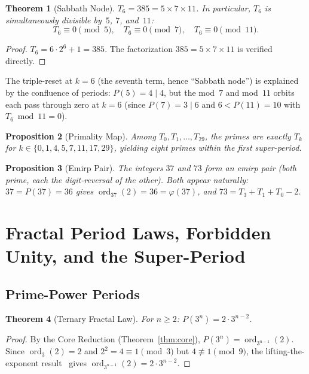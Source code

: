 \documentclass[11pt, a4paper]{article}
\theoremstyle{plain}
\newtheorem{theorem}{Theorem}[section]
\newtheorem{proposition}[theorem]{Proposition}
\theoremstyle{definition}
\theoremstyle{remark}
\newcommand{\ord}{\operatorname{ord}}
\begin{document}
\begin{theorem}[Sabbath Node]\label{thm:sabbath}
$T_6 = 385 = 5 \times 7 \times 11$. In particular, $T_6$ is
simultaneously divisible by~$5$, $7$, and~$11$:
\[
  T_6 \equiv 0 \pmod{5}, \quad
  T_6 \equiv 0 \pmod{7}, \quad
  T_6 \equiv 0 \pmod{11}.
\]
\end{theorem}

\begin{proof}
$T_6 = 6 \cdot 2^6 + 1 = 385$. The factorization $385 = 5 \times 7
\times 11$ is verified directly.
\end{proof}

The triple-reset at $k = 6$ (the seventh term, hence ``Sabbath node'')
is explained by the confluence of periods: $P(5) = 4 \mid 4$, but the
mod~$7$ and mod~$11$ orbits each pass through zero at $k = 6$
(since $P(7) = 3 \mid 6$ and $6 < P(11) = 10$ with
$T_6 \bmod 11 = 0$).

\begin{proposition}[Primality Map]\label{prop:primality}
Among $T_0, T_1, \ldots, T_{29}$, the primes are exactly
$T_k$ for $k \in \{0, 1, 4, 5, 7, 11, 17, 29\}$, yielding eight
primes within the first super-period.
\end{proposition}

\begin{proposition}[Emirp Pair]\label{prop:emirp}
The integers $37$ and $73$ form an emirp pair (both prime, each the
digit-reversal of the other). Both appear naturally:
$37 = P(37) = 36$ gives $\ord_{37}(2) = 36 = \varphi(37)$, and
$73 = T_3 + T_1 + T_0 - 2$.
\end{proposition}

\section{Fractal Period Laws, Forbidden Unity, and the Super-Period}

\subsection{Prime-Power Periods}

\begin{theorem}[Ternary Fractal Law]\label{thm:ternary}
For $n \geq 2$: $P(3^n) = 2 \cdot 3^{n-2}$.
\end{theorem}

\begin{proof}
By the Core Reduction (Theorem~\ref{thm:core}),
$P(3^n) = \ord_{3^{n-1}}(2)$. Since $\ord_3(2) = 2$ and $2^2 = 4
\equiv 1 \pmod{3}$ but $4 \not\equiv 1 \pmod{9}$, the
lifting-the-exponent result~\cite{narkiewicz} gives
$\ord_{3^{n-1}}(2) = 2 \cdot 3^{n-2}$.
\end{proof}
\end{document}
